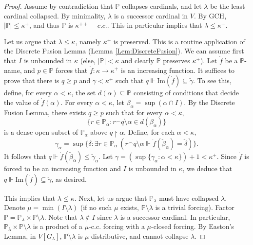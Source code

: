 \documentclass{article}
\theoremstyle{definition}
\theoremstyle{plain}
\newcommand{\po}{\mathbb{P}}
\newcommand{\uhr}{\upharpoonright}
\begin{document}
\begin{proof}
    Assume by contradiction that $\po$ collapses cardinals, and let $\lambda$ be the least cardinal collapsed. By minimality, $\lambda$ is a successor cardinal in $V$. By {\rm GCH}, $|\po| \leq \kappa^{+}$, and thus $\po$ is $\kappa^{++}-c.c.$. This in particular implies that $\lambda\leq \kappa^+$. 
    
    Let us argue that $\lambda\leq \kappa$, namely $\kappa^+$ is preserved. This is a routine application of the Discrete Fusion Lemma (Lemma \ref{Lem:DiscreteFusion}). We can assume first that $I$ is unbounded in $\kappa$ (else, $|\po|<\kappa$ and clearly $\po$ preserves $\kappa^{+}$). Let $\dot{f}$ be a $\po$-name, and $p\in \po$ forces that $\dot{f}\colon \kappa\to \kappa^+$ is an increasing function. It suffices to prove that there is $q\geq p$ and $\gamma<\kappa^+$ such that $q\Vdash \text{Im}(\dot{f})\subseteq \check{\gamma}$. To see this, define, for every $\alpha<\kappa$, the set $d(\alpha)\subseteq \po$ consisting of conditions that decide the value of $\dot{f}(\alpha)$. For every $\alpha<\kappa$, let $\beta_\alpha = \sup(\alpha\cap I)$. By the Discrete Fusion Lemma, there exists $q\geq p$ such that for every $\alpha<\kappa$,  
    $$ \{  r\in \po_\alpha \colon r{}^\frown q\setminus \alpha\in d(\beta_\alpha) \} $$
    is a dense open subset of $\po_\alpha$ above $q\uhr \alpha$. Define, for each $\alpha<\kappa$,
    $$ \gamma_\alpha = \sup\{  \delta \colon \exists r\in \po_{\alpha} \   \left( r{}^\frown q\setminus \alpha \Vdash \dot{f}(\check{\beta}_\alpha) = \check{\delta} \right) \}. $$
    It follows that $q\Vdash \dot{f}(\check{\beta}_\alpha)\leq \check{\gamma}_\alpha$. Let $\gamma = (\sup \{\gamma_\alpha\colon \alpha<\kappa\})+1<\kappa^+$. Since $\dot{f}$ is forced to be an increasing function and $I$ is unbounded in $\kappa$, we deduce that $q\Vdash \mbox{Im}(\dot{f})\subseteq \check{\gamma}$, as desired. 

    This implies that $\lambda\leq \kappa$. Next, let us argue that $\po_\lambda$ must have collapsed $\lambda$. Denote $\mu = \min(I\setminus \lambda)$ (if no such $\mu$ exists, $\po\setminus \lambda$ is a trivial forcing). Factor $\po = \po_\lambda \times \po\setminus \lambda$. Note that $\lambda\notin I$ since $\lambda$ is a successor cardinal. In particular, $\po_\lambda \times \po\setminus \lambda$ is a product of a $\mu$-c.c. forcing with a $\mu$-closed forcing. By Easton's Lemma, in $V[G_{\lambda}]$,  $\po\setminus \lambda$ is $\mu$-distributive, and cannot collapse $\lambda$. 


\end{proof}
\end{document}

